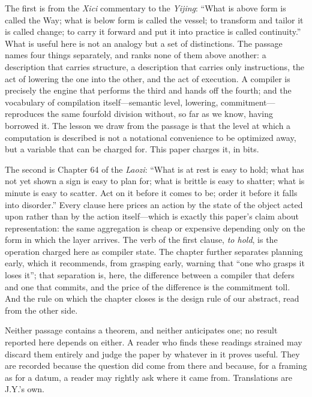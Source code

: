 \documentclass[aps,prx,reprint,superscriptaddress,floatfix,longbibliography]{revtex4-2}
\begin{document}
\begin{acknowledgements}
The first is from the \emph{Xici} commentary to the \emph{Yijing}: ``What
is above form is called the Way; what is below form is called the vessel;
to transform and tailor it is called change; to carry it forward and put it
into practice is called continuity.''  What is useful here is not an
analogy but a set of distinctions.  The passage names four things
separately, and ranks none of them above another: a description that
carries structure, a description that carries only instructions, the act of
lowering the one into the other, and the act of execution.  A compiler is
precisely the engine that performs the third and hands off the fourth; and
the vocabulary of compilation itself---semantic level, lowering,
commitment---reproduces the same fourfold division without, so far as we
know, having borrowed it.  The lesson we draw from the passage is that
the level at which a computation is described is not a notational
convenience to be optimized away, but a variable that can be charged for.
This paper charges it, in bits.

The second is Chapter 64 of the \emph{Laozi}: ``What is at rest is easy to
hold; what has not yet shown a sign is easy to plan for; what is brittle is
easy to shatter; what is minute is easy to scatter.  Act on it before it
comes to be; order it before it falls into disorder.''  Every clause here
prices an action by the state of the object acted upon rather than by the
action itself---which is exactly this paper's claim about representation:
the same aggregation is cheap or expensive depending only on the form in
which the layer arrives.  The verb of the first clause, \emph{to hold}, is
the operation charged here as compiler state.  The chapter further
separates planning early, which it recommends, from grasping early, warning
that ``one who grasps it loses it''; that separation is,
here, the difference between a compiler that defers and one that commits,
and the price of the difference is the commitment toll.  And the rule on
which the chapter closes is the design rule of our abstract, read from the
other side.

Neither passage contains a theorem, and neither anticipates one; no result
reported here depends on either.  A reader who finds these readings
strained may discard them entirely and judge the paper by whatever in it
proves useful.  They are recorded because the question did come from there
and because, for a framing as for a datum, a reader may rightly ask where it
came from.  Translations are J.Y.'s own.
\fi\fi


\end{acknowledgements}
\end{document}
